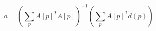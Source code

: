 \begin{equation}
    \label{eq:optimal-parameter-affine}
    a = \left (\sum_p A[p]^T A[p] \right )^{-1} \left (\sum_p A[p]^T d(p) \right)
\end{equation}
